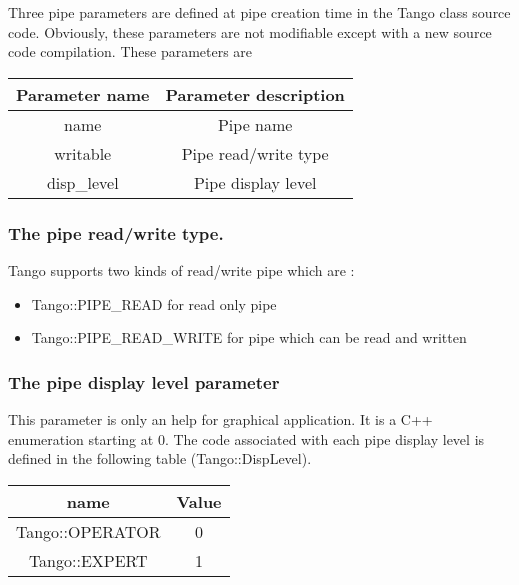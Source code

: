 Three pipe parameters are defined at pipe creation time
in the Tango class source code. Obviously, these parameters are not
modifiable except with a new source code compilation. These parameters
are 

\vspace{0.3cm}


\begin{center}
\begin{longtable}{|c|c|}
\hline 
Parameter name & Parameter description\tabularnewline
\hline 
\hline 
name & Pipe name\tabularnewline
\hline 
writable\index{writable} & Pipe read/write type\tabularnewline
\hline 
disp\_level\index{disp_level@disp\_level} & Pipe display level\tabularnewline
\hline 
\end{longtable}
\par\end{center}


\subsubsection{The pipe read/write type. }

Tango supports two kinds of read/write pipe which are :
\begin{itemize}
\item Tango::PIPE\_READ for read only pipe
\item Tango::PIPE\_READ\_WRITE for pipe which can be
read and written
\end{itemize}

\subsubsection{The pipe display level parameter}

This parameter is only an help for graphical application. It is a
C++ enumeration starting at 0. The code associated with each pipe
display level is defined in the following table (Tango::DispLevel).

\vspace{0.3cm}


\begin{center}
\begin{longtable}{|c|c|}
\hline 
name & Value\tabularnewline
\hline 
\hline 
Tango::OPERATOR & 0\tabularnewline
\hline 
Tango::EXPERT & 1\tabularnewline
\hline 
\end{longtable}
\par\end{center}

